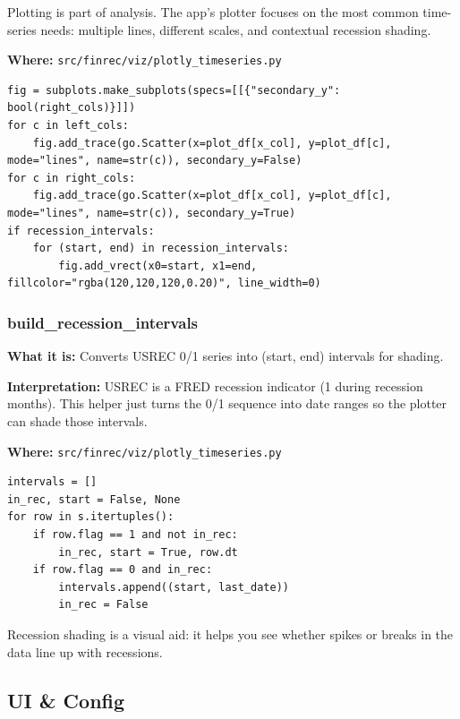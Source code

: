 \documentclass[11pt,a4paper]{article}
\begin{document}
\begin{intuitionbox}
Plotting is part of analysis. The app’s plotter focuses on the most common time-series needs: multiple lines, different scales, and contextual recession shading.
\end{intuitionbox}

\textbf{Where:} \texttt{src/finrec/viz/plotly\_timeseries.py}

\begin{lstlisting}
fig = subplots.make_subplots(specs=[[{"secondary_y": bool(right_cols)}]])
for c in left_cols:
    fig.add_trace(go.Scatter(x=plot_df[x_col], y=plot_df[c], mode="lines", name=str(c)), secondary_y=False)
for c in right_cols:
    fig.add_trace(go.Scatter(x=plot_df[x_col], y=plot_df[c], mode="lines", name=str(c)), secondary_y=True)
if recession_intervals:
    for (start, end) in recession_intervals:
        fig.add_vrect(x0=start, x1=end, fillcolor="rgba(120,120,120,0.20)", line_width=0)
\end{lstlisting}

\subsubsection{build\_recession\_intervals}\label{sec:recession}

\textbf{What it is:} Converts USREC 0/1 series into (start, end) intervals for shading.

\textbf{Interpretation:} USREC is a FRED recession indicator (1 during recession months). This helper just turns the 0/1 sequence into date ranges so the plotter can shade those intervals.

\textbf{Where:} \texttt{src/finrec/viz/plotly\_timeseries.py}

\begin{lstlisting}
intervals = []
in_rec, start = False, None
for row in s.itertuples():
    if row.flag == 1 and not in_rec:
        in_rec, start = True, row.dt
    if row.flag == 0 and in_rec:
        intervals.append((start, last_date))
        in_rec = False
\end{lstlisting}

\begin{intuitionbox}
Recession shading is a visual aid: it helps you see whether spikes or breaks in the data line up with recessions.
\end{intuitionbox}

\subsection{UI \& Config}
\end{document}

